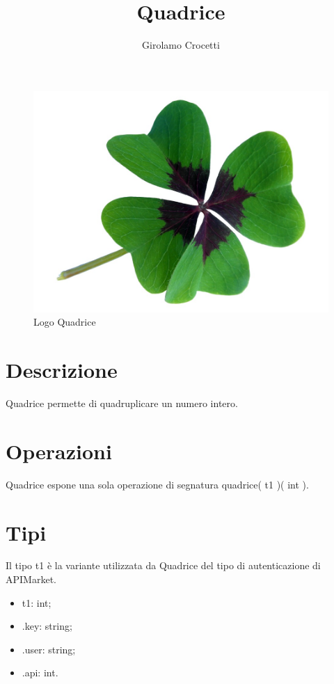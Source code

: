 \documentclass[a4paper]{article}
\title{Quadrice}
\author{Girolamo Crocetti}
\begin{document}
\maketitle

\begin{figure}[H]
	\centering
	\includegraphics[width=0.3\linewidth]{Quadrice.jpg}
	\caption{Logo Quadrice}
\end{figure}

\section{Descrizione}

Quadrice permette di quadruplicare un numero intero.

\section{Operazioni}

Quadrice espone una sola operazione di segnatura quadrice( t1 )( int ).

\section{Tipi}

Il tipo t1 è la variante utilizzata da Quadrice del tipo di autenticazione di APIMarket.
\begin{itemize}
	\item t1: int;
	\item .key: string;
	\item .user: string;
	\item .api: int.
\end{itemize}
\end{document}
